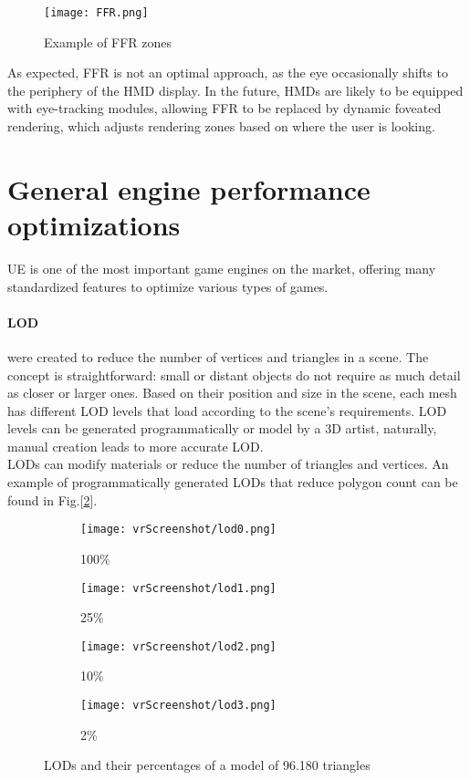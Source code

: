 \begin{figure}[ht]
  \texttt{[image: FFR.png]}
  \caption{Example of FFR zones}
  \label{fig:FFR}
\end{figure}

\noindent
As expected, \ac{FFR} is not an optimal approach, as the eye occasionally shifts to the periphery of the \ac{HMD} display.
In the future, \ac{HMD}s are likely to be equipped with eye-tracking modules, allowing \ac{FFR} to be replaced by dynamic foveated rendering, which adjusts rendering zones based on where the user is looking.

\section{General engine performance optimizations}
\noindent
\ac{UE} is one of the most important game engines on the market, offering many standardized features to optimize various types of games.

\paragraph{\ac{LOD}}
were created to reduce the number of vertices and triangles in a scene.
The concept is straightforward: small or distant objects do not require as much detail as closer or larger ones. 
Based on their position and size in the scene, each mesh has different \ac{LOD} levels that load according to the scene's requirements.
\ac{LOD} levels can be generated programmatically or model by a 3D artist, naturally, manual creation leads to more accurate \ac{LOD}.\\
\ac{LOD}s can modify materials or reduce the number of triangles and vertices. An example of programmatically generated LODs that reduce polygon count can be found in Fig.[\ref{fig:lods}].

\captionsetup[subfigure]{labelformat=empty}
\begin{figure}[h]
  \centering
  \begin{subfigure}{0.24\textwidth}
      \texttt{[image: vrScreenshot/lod0.png]}
      \caption{100\%}
  \end{subfigure}
  \begin{subfigure}{0.24\textwidth}
      \texttt{[image: vrScreenshot/lod1.png]}
      \caption{25\%}
  \end{subfigure}
  \begin{subfigure}{0.24\textwidth}
      \texttt{[image: vrScreenshot/lod2.png]}
      \caption{10\%}
  \end{subfigure}
  \begin{subfigure}{0.24\textwidth}
      \texttt{[image: vrScreenshot/lod3.png]}
      \caption{2\%}
  \end{subfigure}
  \caption{LODs and their percentages of a model of 96.180 triangles}
  \label{fig:lods}
\end{figure}

